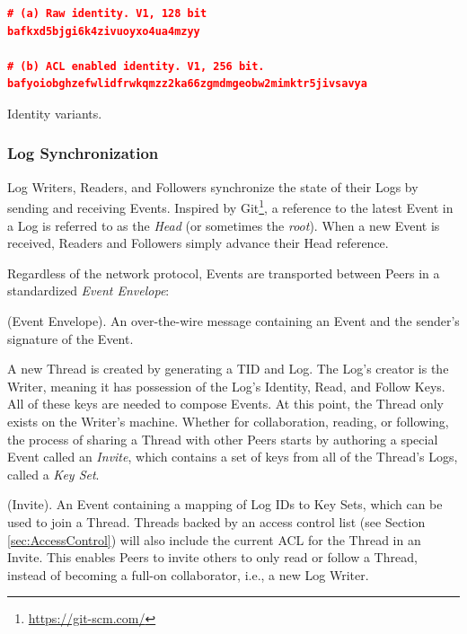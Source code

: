 \documentclass{textile}
\begin{document}
\begin{example*}
\centering
\begin{minipage}{0.6\textwidth}
\begin{lstlisting}[language=json,firstnumber=1]
# (a) Raw identity. V1, 128 bit
bafkxd5bjgi6k4zivuoyxo4ua4mzyy

# (b) ACL enabled identity. V1, 256 bit.
bafyoiobghzefwlidfrwkqmzz2ka66zgmdmgeobw2mimktr5jivsavya
\end{lstlisting}
\end{minipage}
  \caption{Identity variants.}
  \label{ex:Identity}
\end{example*}

\subsubsection{Log Synchronization} \label{sec:LogSync}

Log Writers, Readers, and Followers synchronize the state of their Logs by sending and receiving Events. Inspired by Git\footnote{\url{https://git-scm.com/}}, a reference to the latest Event in a Log is referred to as the \emph{Head} (or sometimes the \emph{root}). When a new Event is received, Readers and Followers simply advance their Head reference.

Regardless of the network protocol, Events are transported between Peers in a standardized \emph{Event Envelope}:

\begin{definition}
(Event Envelope). An over-the-wire message containing an Event and the sender's signature of the Event.
\end{definition}

A new Thread is created by generating a TID and Log. The Log's creator is the Writer, meaning it has possession of the Log's Identity, Read, and Follow Keys. All of these keys are needed to compose Events. At this point, the Thread only exists on the Writer's machine. Whether for collaboration, reading, or following, the process of sharing a Thread with other Peers starts by authoring a special Event called an \emph{Invite}, which contains a set of keys from all of the Thread's Logs, called a \emph{Key Set}.

\begin{definition}
(Invite). An Event containing a mapping of Log IDs to Key Sets, which can be used to join a Thread. Threads backed by an access control list (see Section  \ref{sec:AccessControl}) will also include the current ACL for the Thread in an Invite. This enables Peers to invite others to only read or follow a Thread, instead of becoming a full-on collaborator, i.e., a new Log Writer.
\end{definition}
\end{document}

